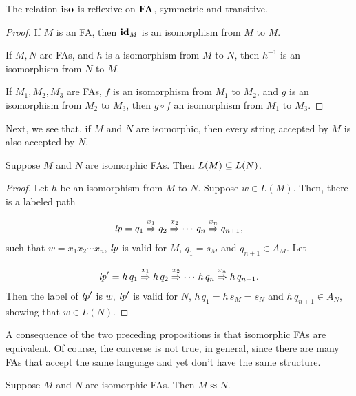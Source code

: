 \begin{proposition}
\label{IsoEquivProp}
The relation $\mathbin{\mathbf{iso}}$ is reflexive on $\mathbf{FA}$, symmetric and transitive.
%
%
%
%
%
%
\end{proposition}

\begin{proof}
If $M$ is an FA, then $\mathbf{id}_M$ is an isomorphism from $M$ to $M$.

If $M,N$ are FAs, and $h$ is a isomorphism from $M$ to $N$, then
$h^{-1}$ is an isomorphism from $N$ to $M$.

If $M_1,M_2,M_3$ are FAs, $f$ is an isomorphism from $M_1$ to $M_2$,
and $g$ is an isomorphism from $M_2$ to $M_3$, then $g\circ f$ an
isomorphism from $M_1$ to $M_3$.
\end{proof}

Next, we see that, if $M$ and $N$ are isomorphic, then
every string accepted by $M$ is also accepted by $N$.

\begin{proposition}
\label{IsoSubProp}
Suppose $M$ and $N$ are isomorphic FAs.  Then $L(M)\subseteq L(N)$.
\end{proposition}

\begin{proof}
Let $h$ be an isomorphism from $M$ to $N$.  Suppose $w\in L(M)$.
Then, there is a labeled path
\begin{gather*}
{\it lp} = q_1\stackrel{\strut x_1}{\Rightarrow}q_2\stackrel{\strut x_2}{\Rightarrow}\cdots\,q_n\stackrel{\strut x_n}{\Rightarrow}q_{n+1} ,
\end{gather*}
such that $w=x_1x_2\cdots x_n$, ${\it lp}$ is valid for $M$,
$q_1 = s_M$ and $q_{n+1}\in A_M$.  Let
\begin{gather*}
{\it lp}' = h\,q_1\stackrel{\strut x_1}{\Rightarrow}h\,q_2\stackrel{\strut x_2}{\Rightarrow}\cdots\,h\,q_n
\stackrel{\strut x_n}{\Rightarrow}h\,q_{n+1}.
\end{gather*}
Then the label of ${\it lp}'$ is $w$, ${\it lp}'$ is valid for $N$,
$h\,q_1=h\,s_M=s_N$ and $h\,q_{n+1}\in A_N$, showing that $w\in L(N)$.
\end{proof}

A consequence of the two preceding propositions is that
isomorphic FAs are equivalent.  Of course, the converse is
not true, in general, since there are many FAs that accept the
same language and yet don't have the same structure.

\begin{proposition}
Suppose $M$ and $N$ are isomorphic FAs. Then $M\approx N$.
\end{proposition}

